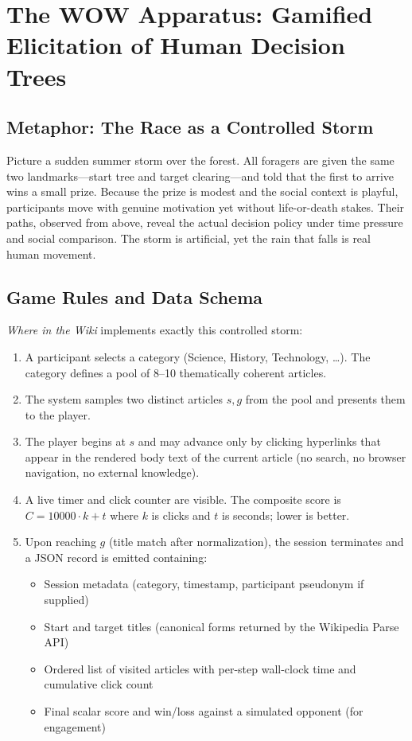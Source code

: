 \documentclass[11pt,a4paper]{report}
\begin{document}
\chapter{The WOW Apparatus: Gamified Elicitation of Human Decision Trees}

\section{Metaphor: The Race as a Controlled Storm}

Picture a sudden summer storm over the forest. All foragers are given the same two landmarks—start tree and target clearing—and told that the first to arrive wins a small prize. Because the prize is modest and the social context is playful, participants move with genuine motivation yet without life-or-death stakes. Their paths, observed from above, reveal the actual decision policy under time pressure and social comparison. The storm is artificial, yet the rain that falls is real human movement.

\section{Game Rules and Data Schema}

\textit{Where in the Wiki} implements exactly this controlled storm:

\begin{enumerate}
    \item A participant selects a category (Science, History, Technology, \dots). The category defines a pool of 8--10 thematically coherent articles.
    \item The system samples two distinct articles \(s, g\) from the pool and presents them to the player.
    \item The player begins at \(s\) and may advance only by clicking hyperlinks that appear in the rendered body text of the current article (no search, no browser navigation, no external knowledge).
    \item A live timer and click counter are visible. The composite score is \(C = 10000 \cdot k + t\) where \(k\) is clicks and \(t\) is seconds; lower is better.
    \item Upon reaching \(g\) (title match after normalization), the session terminates and a JSON record is emitted containing:
    \begin{itemize}
        \item Session metadata (category, timestamp, participant pseudonym if supplied)
        \item Start and target titles (canonical forms returned by the Wikipedia Parse API)
        \item Ordered list of visited articles with per-step wall-clock time and cumulative click count
        \item Final scalar score and win/loss against a simulated opponent (for engagement)
    \end{itemize}
\end{enumerate}
\end{document}
